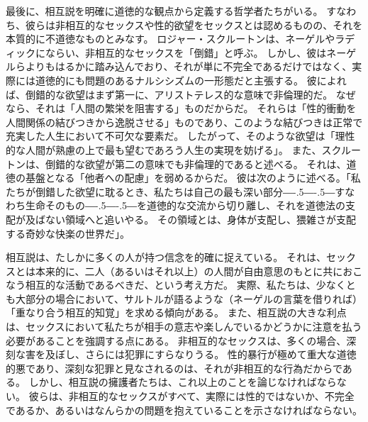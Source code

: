 \documentclass[paper=a4,book,openany]{jlreq}
\def\DDASH{―\kern-.5\zw―\kern-.5\zw―} %
\begin{document}
最後に、相互説を明確に道徳的な観点から定義する哲学者たちがいる。
すなわち、彼らは非相互的なセックスや性的欲望をセックスとは認めるものの、それを本質的に不道徳なものとみなす。
ロジャー・スクルートンは、ネーゲルやラディックにならい、非相互的なセックスを「倒錯」と呼ぶ。
しかし、彼はネーゲルらよりもはるかに踏み込んでおり、それが単に不完全であるだけではなく、実際には道徳的にも問題のあるナルシシズムの一形態だと主張する。
彼によれば、倒錯的な欲望はまず第一に、アリストテレス的な意味で非倫理的だ。
なぜなら、それは「人間の繁栄を阻害する」ものだからだ。
それらは「性的衝動を人間関係の結びつきから逸脱させる」ものであり、このような結びつきは正常で充実した人生において不可欠な要素だ。
したがって、そのような欲望は「理性的な人間が熟慮の上で最も望むであろう人生の実現を妨げる」\citep[p.317]{scruton06:_sexual_desir}。
また、スクルートンは、倒錯的な欲望が第二の意味でも非倫理的であると述べる。
それは、道徳の基盤となる「他者への配慮」を弱めるからだ。
彼は次のように述べる。「私たちが倒錯した欲望に耽るとき、私たちは自己の最も深い部分{\DDASH}すなわち生命そのもの{\DDASH}を道徳的な交流から切り離し、それを道徳法の支配が及ばない領域へと追いやる。
その領域とは、身体が支配し、猥雑さが支配する奇妙な快楽の世界だ」\citep[p.289]{scruton06:_sexual_desir}。

相互説は、たしかに多くの人が持つ信念を的確に捉えている。
それは、セックスとは本来的に、二人（あるいはそれ以上）の人間が自由意思のもとに共におこなう相互的な活動であるべきだ、という考え方だ。
実際、私たちは、少なくとも大部分の場合において、サルトルが語るような（ネーゲルの言葉を借りれば）「重なり合う相互的知覚」を求める傾向がある。
また、相互説の大きな利点は、セックスにおいて私たちが相手の意志や楽しんでいるかどうかに注意を払う必要があることを強調する点にある。
非相互的なセックスは、多くの場合、深刻な害を及ぼし、さらには犯罪にすらなりうる。
性的暴行が極めて重大な道徳的悪であり、深刻な犯罪と見なされるのは、それが非相互的な行為だからである\citep[cf.][]{woollard19:_promis_paedop_rape_signif_sexual}。
しかし、相互説の擁護者たちは、これ以上のことを論じなければならない。
彼らは、非相互的なセックスがすべて、実際には性的ではないか、不完全であるか、あるいはなんらかの問題を抱えていることを示さなければならない。
\end{document}
